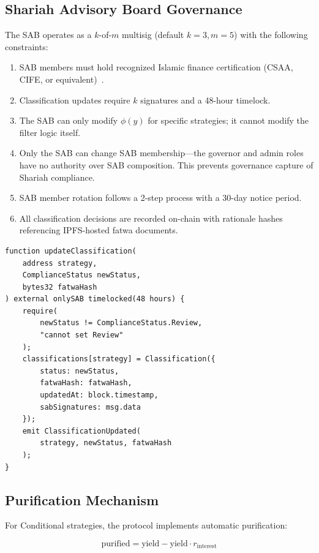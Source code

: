 \documentclass[11pt,twocolumn]{article}
\theoremstyle{definition}
\begin{document}
\subsection{Shariah Advisory Board Governance}

The SAB operates as a $k$-of-$m$ multisig (default $k=3, m=5$) with the following constraints:

\begin{enumerate}[nosep]
  \item SAB members must hold recognized Islamic finance certification (CSAA, CIFE, or equivalent)~\cite{aaoifi2015}.
  \item Classification updates require $k$ signatures and a 48-hour timelock.
  \item The SAB can only modify $\phi(y)$ for specific strategies; it cannot modify the filter logic itself.
  \item Only the SAB can change SAB membership---the governor and admin roles have no authority over SAB composition. This prevents governance capture of Shariah compliance.
  \item SAB member rotation follows a 2-step process with a 30-day notice period.
  \item All classification decisions are recorded on-chain with rationale hashes referencing IPFS-hosted fatwa documents.
\end{enumerate}

\begin{lstlisting}[language=Solidity,caption=ShariaFilter classification update]
function updateClassification(
    address strategy,
    ComplianceStatus newStatus,
    bytes32 fatwaHash
) external onlySAB timelocked(48 hours) {
    require(
        newStatus != ComplianceStatus.Review,
        "cannot set Review"
    );
    classifications[strategy] = Classification({
        status: newStatus,
        fatwaHash: fatwaHash,
        updatedAt: block.timestamp,
        sabSignatures: msg.data
    });
    emit ClassificationUpdated(
        strategy, newStatus, fatwaHash
    );
}
\end{lstlisting}

\subsection{Purification Mechanism}

For Conditional strategies, the protocol implements automatic purification:

\begin{equation}
  \text{purified} = \text{yield} - \text{yield} \cdot r_{\text{interest}}
\end{equation}
\end{document}
